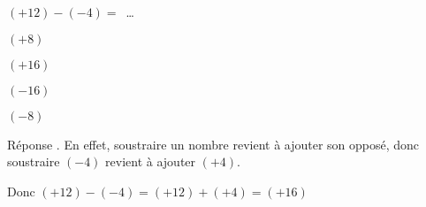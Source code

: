 \begin{exercice}
    $(+12)-(-4)=$~\ldots
    \begin{ChoixQCM}{4}
        \item $(+8)$
        \item $(+16)$
        \item $(-16)$
        \item $(-8)$
    \end{ChoixQCM}
\end{exercice}
\begin{corrige}
    Réponse . En effet, soustraire un nombre revient à ajouter son opposé, donc soustraire $(-4)$ revient à ajouter $(+4)$.

    Donc $(+12)-(-4)=(+12)+(+4)=(+16)$
\end{corrige}